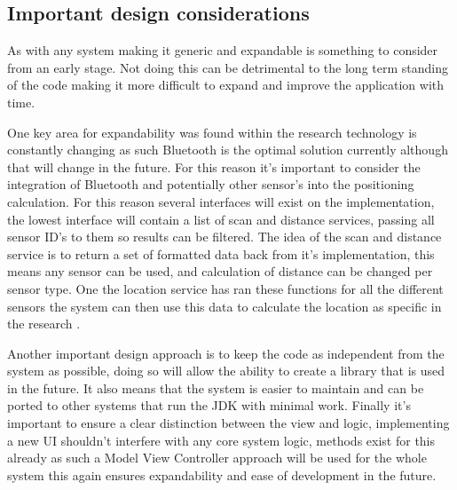 \subsection{Important design considerations}
As with any system making it generic and expandable is something to consider from an early stage. Not doing this can be detrimental to the long term standing of the code making it more difficult to expand and improve the application with time.

One key area for expandability was found within the research \citetemp technology is constantly changing as such Bluetooth is the optimal solution currently although that will change in the future. For this reason it's important to consider the integration of Bluetooth and potentially other sensor's into the positioning calculation. For this reason several interfaces will exist on the implementation, the lowest interface will contain a list of scan and distance services, passing all sensor ID's to them so results can be filtered. The idea of the scan and distance service is to return a set of formatted data back from it's implementation, this means any sensor can be used, and calculation of distance can be changed per sensor type. One the location service has ran these functions for all the different sensors the system can then use this data to calculate the location as specific in the research \citetemp.

Another important design approach is to keep the code as independent from the system as possible, doing so will allow the ability to create a library that is used in the future. It also means that the system is easier to maintain and can be ported to other systems that run the JDK with minimal work. Finally it's important to ensure a clear distinction between the view and logic, implementing a new UI shouldn't interfere with any core system logic, methods exist for this already as such a Model View Controller approach will be used for the whole system this again ensures expandability and ease of development in the future.